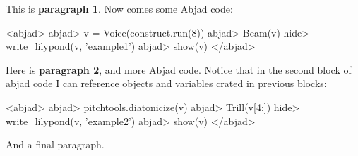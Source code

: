 \documentclass[11pt]{article}
\begin{document}
This is \textbf{paragraph 1}.
Now comes some Abjad code:

<abjad>
   abjad> v = Voice(construct.run(8))
   abjad> Beam(v)
   hide> write_lilypond(v, 'example1')
   abjad> show(v)
</abjad>

Here is \textbf{paragraph 2}, and more Abjad code. Notice that in the second block of abjad code I can reference objects and variables crated in previous blocks:

<abjad>
   abjad> pitchtools.diatonicize(v)
   abjad> Trill(v[4:])
   hide> write_lilypond(v, 'example2')
   abjad> show(v)
</abjad>

And a final paragraph.
\end{document}
